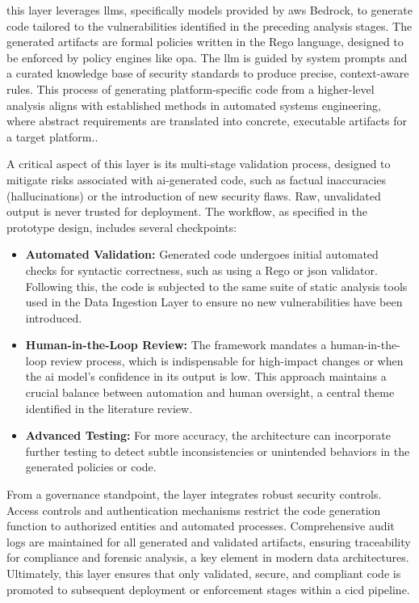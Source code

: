 this layer leverages \glspl{llm}, specifically models provided by \gls{aws} Bedrock, to generate code tailored to the vulnerabilities identified in the preceding analysis stages. The generated artifacts are formal policies written in the Rego language, designed to be enforced by policy engines like \gls{opa}. The \gls{llm} is guided by system prompts and a curated knowledge base of security standards to produce precise, context-aware rules. This process of generating platform-specific code from a higher-level analysis aligns with established methods in automated systems engineering, where abstract requirements are translated into concrete, executable artifacts for a target platform.\cite{chen_platform-specific_2025}.

A critical aspect of this layer is its multi-stage validation process, designed to mitigate risks associated with \gls{ai}-generated code, such as factual inaccuracies (hallucinations) or the introduction of new security flaws\cite{kumar_generative_nodate}. Raw, unvalidated output is never trusted for deployment. The workflow, as specified in the prototype design, includes several checkpoints:

\begin{itemize}
\item \textbf{Automated Validation:} Generated code undergoes initial automated checks for syntactic correctness, such as using a Rego or \gls{json} validator. Following this, the code is subjected to the same suite of static analysis tools used in the Data Ingestion Layer to ensure no new vulnerabilities have been introduced.
\item \textbf{Human-in-the-Loop Review:} The framework mandates a human-in-the-loop review process, which is indispensable for high-impact changes or when the \gls{ai} model's confidence in its output is low. This approach maintains a crucial balance between automation and human oversight, a central theme identified in the literature review.
\item \textbf{Advanced Testing:} For more accuracy, the architecture can incorporate further testing to detect subtle inconsistencies or unintended behaviors in the generated policies or code.
\end{itemize}

From a governance standpoint, the layer integrates robust security controls. Access controls and authentication mechanisms restrict the code generation function to authorized entities and automated processes. Comprehensive audit logs are maintained for all generated and validated artifacts, ensuring traceability for compliance and forensic analysis, a key element in modern data architectures\cite{ismail_big_2025-1}. Ultimately, this layer ensures that only validated, secure, and compliant code is promoted to subsequent deployment or enforcement stages within a \gls{cicd} pipeline.

